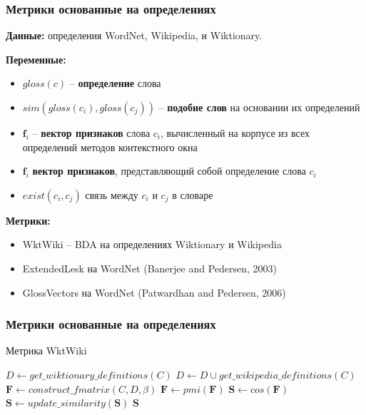 \documentclass{beamer}
\begin{document}
\begin{frame}
\frametitle{Метрики основанные на определениях}

\textbf{Данные:} определения WordNet, Wikipedia, и Wiktionary.
	
\textbf{Переменные:}
\begin{itemize}
		\item $gloss(c)$ -- \textbf{определение} слова
		\item $sim(gloss(c_i),gloss(c_j))$ -- \textbf{подобие слов} на основании их определений
		\item $\mathbf{f}_i$ -- \textbf{вектор признаков} слова $c_i$, вычисленный на корпусе из всех определений методов контекстного окна
		\item $\mathbf{f}_i$ \textbf{вектор признаков}, представляющий собой определение слова $c_i$
		\item $exist(c_i, c_j)$ связь между $c_i$ и $c_j$ в словаре
\end{itemize}

\textbf{Метрики:}
\begin{itemize}
  \item WktWiki -- BDA на определениях Wiktionary и Wikipedia
  \item ExtendedLesk на WordNet (Banerjee and Pedersen, 2003)
  \item GlossVectors на WordNet (Patwardhan and Pedersen, 2006)
\end{itemize}

\end{frame}


\begin{frame}
\frametitle{Метрики основанные на определениях  }

\begin{block}{Метрика WktWiki }
\begin{algorithm}[H]
\SetLine
{}

$D \leftarrow get\_wiktionary\_definitions(C)$ \;
$D \leftarrow D \cup get\_wikipedia\_definitions(C)$ \;
$\mathbf{F} \leftarrow construct\_fmatrix(C, D,  \beta)$ \;
$\mathbf{F} \leftarrow pmi(\mathbf{F}) $ \;
$\mathbf{S} \leftarrow cos(\mathbf{F})$ \;
$\mathbf{S} \leftarrow update\_similarity(\mathbf{S})$ \;
\Return $\mathbf{S}$ \;
\label{alg:wkt}
\end{algorithm}
\end{block}

\end{frame}
\end{document}
